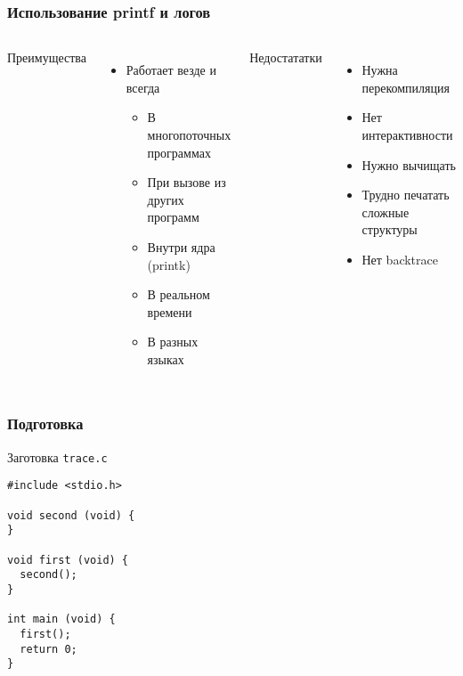 \begin{frame}
 \frametitle{Использование printf и логов}
 \begin{columns}
    \begin{center}
     Преимущества 
    \end{center}
    \begin{itemize}
     \item Работает везде и всегда
     \begin{itemize}
       \item В многопоточных программах
       \item При вызове из других программ
       \item Внутри ядра (printk)
       \item В реальном времени
       \item В разных языках
      \end{itemize}
    \end{itemize}
    \begin{center}
     Недостататки
    \end{center}
    \begin{itemize}
     \item Нужна перекомпиляция
     \item Нет интерактивности
     \item Нужно вычищать
     \item Трудно печатать сложные структуры
     \item Нет backtrace
    \end{itemize}
 \end{columns}
\end{frame}

\begin{frame}[fragile]
	\frametitle{Подготовка}

	\begin{block}{Заготовка {\tt trace.c}}
	
	\begin{lstlisting}
#include <stdio.h>

void second (void) {
}

void first (void) {
  second();
}

int main (void) {
  first();
  return 0;
}
	\end{lstlisting}
	\end{block}

\end{frame}



